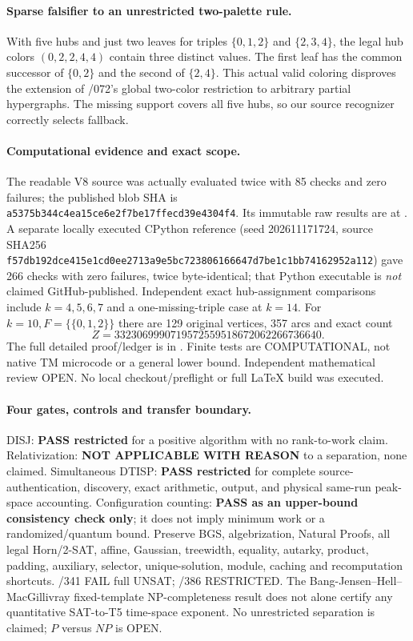\documentclass[11pt]{article}
\begin{document}
\paragraph{Sparse falsifier to an unrestricted two-palette rule.}
With five hubs and just two leaves for triples
$\{0,1,2\}$ and $\{2,3,4\}$, the legal hub colors
$(0,2,2,4,4)$ contain three distinct values.
The first leaf has the common successor of
$\{0,2\}$ and the second of $\{2,4\}$.
This actual valid coloring disproves the extension of
/072's global two-color restriction to arbitrary
partial hypergraphs. The missing support covers all five
hubs, so our source recognizer correctly selects fallback.

\paragraph{Computational evidence and exact scope.}
The readable V8 source
was actually evaluated twice with 85 checks and zero failures;
the published blob SHA is
\texttt{a5375b344c4ea15ce6e2f7be17ffecd39e4304f4}.
Its immutable raw results are at
.
A separate locally executed CPython reference
(seed 202611171724, source SHA256
\texttt{f57db192dce415e1cd0ee2713a9e5bc723806166647d7be1c1bb74162952a112})
gave 266 checks with zero failures, twice byte-identical;
that Python executable is \emph{not} claimed GitHub-published.
Independent exact hub-assignment comparisons include
$k=4,5,6,7$ and a one-missing-triple case at $k=14$.
For $k=10,F=\{\{0,1,2\}\}$ there are 129 original
vertices, 357 arcs and exact count
\[
Z=3323069990719572559518672062266736640.
\]
The full detailed proof/ledger is in
.
Finite tests are COMPUTATIONAL, not native TM microcode or
a general lower bound. Independent mathematical review OPEN.
No local checkout/preflight or full LaTeX build was executed.

\paragraph{Four gates, controls and transfer boundary.}
DISJ: \textbf{PASS restricted} for a positive algorithm with no
rank-to-work claim. Relativization:
\textbf{NOT APPLICABLE WITH REASON} to a separation, none claimed.
Simultaneous DTISP: \textbf{PASS restricted} for complete
source-authentication, discovery, exact arithmetic, output,
and physical same-run peak-space accounting.
Configuration counting: \textbf{PASS as an upper-bound
consistency check only}; it does not imply minimum work or a
randomized/quantum bound.
Preserve BGS, algebrization, Natural Proofs, all legal
Horn/2-SAT, affine, Gaussian, treewidth, equality,
autarky, product, padding, auxiliary, selector,
unique-solution, module, caching and recomputation
shortcuts. /341 FAIL full UNSAT; /386 RESTRICTED.
The Bang-Jensen--Hell--MacGillivray fixed-template
NP-completeness result does not alone certify any
quantitative SAT-to-T5 time-space exponent.
No unrestricted separation is claimed; $P$ versus $NP$ is OPEN.
\end{document}
